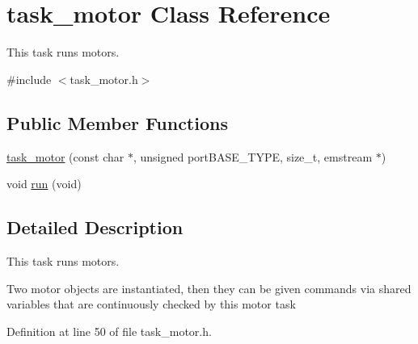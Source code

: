 \hypertarget{classtask__motor}{\section{task\-\_\-motor \-Class \-Reference}
\label{classtask__motor}
}


\-This task runs motors.  




{\ttfamily \#include $<$task\-\_\-motor.\-h$>$}

\subsection*{\-Public \-Member \-Functions}
\begin{DoxyCompactItemize}
\item 
\hyperlink{classtask__motor_a6ed0a0b463e698d636b28bcdd518a027}{task\-\_\-motor} (const char $\ast$, unsigned port\-B\-A\-S\-E\-\_\-\-T\-Y\-P\-E, size\-\_\-t, emstream $\ast$)
\item 
void \hyperlink{classtask__motor_a895a075ec470c9d5a07b8959de06aacd}{run} (void)
\end{DoxyCompactItemize}


\subsection{\-Detailed \-Description}
\-This task runs motors. 

\-Two motor objects are instantiated, then they can be given commands via shared variables that are continuously checked by this motor task 

\-Definition at line 50 of file task\-\_\-motor.\-h.



